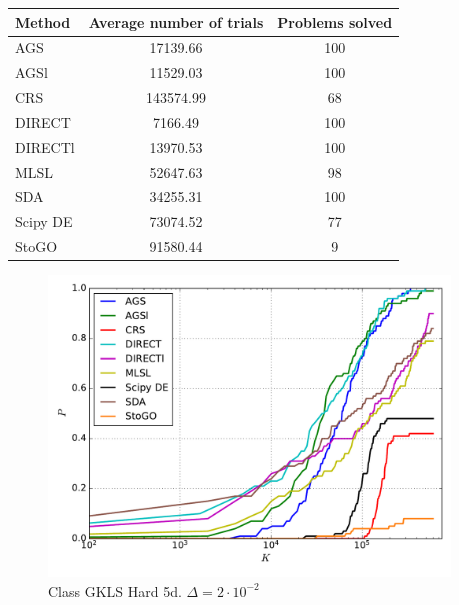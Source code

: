 \documentclass[a4paper]{article}
\begin{document}
\begin{tabular}{lcc}
\hline
 Method   &  Average number of trials  &  Problems solved  \\
\hline
 AGS      &          17139.66          &        100        \\
 AGSl     &          11529.03          &        100        \\
 CRS      &         143574.99          &        68         \\
 DIRECT   &          7166.49           &        100        \\
 DIRECTl  &          13970.53          &        100        \\
 MLSL     &          52647.63          &        98         \\
 SDA      &          34255.31          &        100        \\
 Scipy DE &          73074.52          &        77         \\
 StoGO    &          91580.44          &         9         \\
\hline
\end{tabular}
\begin{figure}[H]
  \center
  \includegraphics[width=0.95\textwidth]{../experiments/gklsh5d/cmc.pdf}
  \caption{Class GKLS Hard 5d. $\Delta=2\cdot10^{-2}$}
\end{figure}
\end{document}
